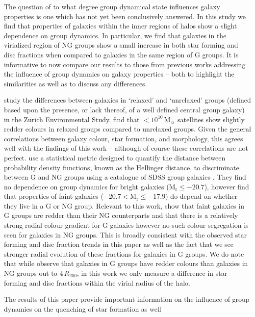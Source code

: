 \documentclass[a4paper,fleqn,usenatbib]{mnras}
\newcommand{\Msun}{\,\mathrm{M_{\sun}}}
\begin{document}
The question of to what degree group dynamical state influences galaxy
properties is one which has not yet been conclusively answered.  In
this study we find that properties of galaxies within the inner
regions of halos show a slight dependence on group dynamics.  In
particular, we find that galaxies in the virialized region of NG
groups show a small increase in both star forming and disc fractions
when compared to galaxies in the same region of G groups.  It is
informative to now compare our results to those from previous 
works addressing the influence of group dynamics on galaxy properties
-- both to highlight the similarities as well as to discuss any
differences.
\par
\citet{carollo2013} study the differences between galaxies in
`relaxed' and `unrelaxed' groups (defined based upon the presence, or
lack thereof, of a well defined central group galaxy) in the Zurich
Environmental Study.  \citet{carollo2013} find that $<10^{10}\Msun$
satellites show slightly redder colours in relaxed groups compared to
unrelaxed groups.  Given the general correlations between galaxy colour, star
formation, and morphology, this agrees well with the findings of this
work -- although of course these correlations are not perfect.
\citet{ribeiro2013} use a statistical metric designed to quantify the
distance between probability density functions, known as the Hellinger
distance, to discriminate between G and NG groups using a
catalogue of SDSS group galaxies
\citep{berlind2006}.  They find no dependence on group dynamics for
bright galaxies ($\mathrm{M_r} \le -20.7$), however find that
properties of faint galaxies ($-20.7 < \mathrm{M_r} \le -17.9$) do
depend on whether they live in a G or NG group.  Relevant to this
work, \citet{ribeiro2013} show that faint galaxies in G groups are
redder than their NG counterparts and that there is a relatively
strong radial colour gradient for G galaxies however no such colour
segregation is seen for galaxies in NG groups.  This is broadly
consistent with the observed star forming and disc fraction trends in
this paper as well as the fact that we see stronger radial evolution
of these fractions for galaxies in G groups.  We do note that while
\citet{ribeiro2010} observe that galaxies in G groups have redder
colours than galaxies in NG groups out to $4\,R_{200}$, in this work
we only measure a difference in star forming and disc fractions within
the virial radius of the halo.
\par
The results of this paper provide important information on the
influence of group dynamics on the quenching of star formation as well
\end{document}
